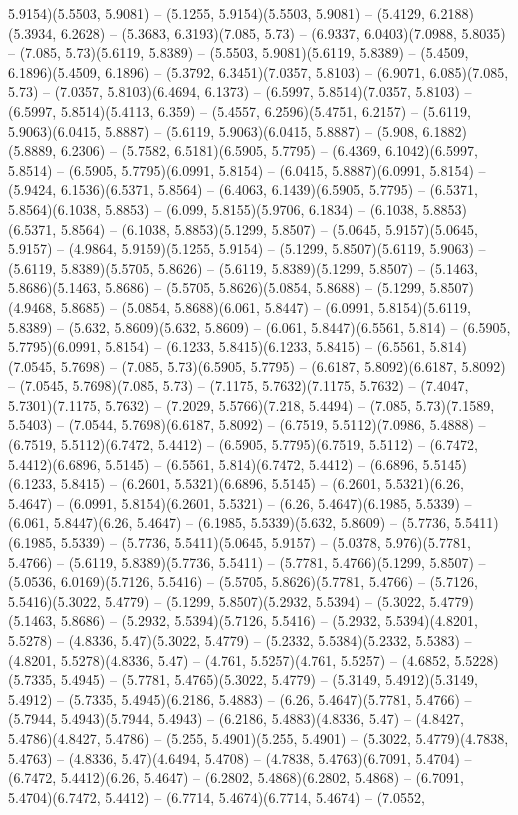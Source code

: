 5.9154)(5.5503, 5.9081) -- (5.1255, 5.9154)(5.5503, 5.9081) -- (5.4129, 6.2188)(5.3934, 6.2628) -- (5.3683, 6.3193)(7.085, 5.73) -- (6.9337, 6.0403)(7.0988, 5.8035) -- (7.085, 5.73)(5.6119, 5.8389) -- (5.5503, 5.9081)(5.6119, 5.8389) -- (5.4509, 6.1896)(5.4509, 6.1896) -- (5.3792, 6.3451)(7.0357, 5.8103) -- (6.9071, 6.085)(7.085, 5.73) -- (7.0357, 5.8103)(6.4694, 6.1373) -- (6.5997, 5.8514)(7.0357, 5.8103) -- (6.5997, 5.8514)(5.4113, 6.359) -- (5.4557, 6.2596)(5.4751, 6.2157) -- (5.6119, 5.9063)(6.0415, 5.8887) -- (5.6119, 5.9063)(6.0415, 5.8887) -- (5.908, 6.1882)(5.8889, 6.2306) -- (5.7582, 6.5181)(6.5905, 5.7795) -- (6.4369, 6.1042)(6.5997, 5.8514) -- (6.5905, 5.7795)(6.0991, 5.8154) -- (6.0415, 5.8887)(6.0991, 5.8154) -- (5.9424, 6.1536)(6.5371, 5.8564) -- (6.4063, 6.1439)(6.5905, 5.7795) -- (6.5371, 5.8564)(6.1038, 5.8853) -- (6.099, 5.8155)(5.9706, 6.1834) -- (6.1038, 5.8853)(6.5371, 5.8564) -- (6.1038, 5.8853)(5.1299, 5.8507) -- (5.0645, 5.9157)(5.0645, 5.9157) -- (4.9864, 5.9159)(5.1255, 5.9154) -- (5.1299, 5.8507)(5.6119, 5.9063) -- (5.6119, 5.8389)(5.5705, 5.8626) -- (5.6119, 5.8389)(5.1299, 5.8507) -- (5.1463, 5.8686)(5.1463, 5.8686) -- (5.5705, 5.8626)(5.0854, 5.8688) -- (5.1299, 5.8507)(4.9468, 5.8685) -- (5.0854, 5.8688)(6.061, 5.8447) -- (6.0991, 5.8154)(5.6119, 5.8389) -- (5.632, 5.8609)(5.632, 5.8609) -- (6.061, 5.8447)(6.5561, 5.814) -- (6.5905, 5.7795)(6.0991, 5.8154) -- (6.1233, 5.8415)(6.1233, 5.8415) -- (6.5561, 5.814)(7.0545, 5.7698) -- (7.085, 5.73)(6.5905, 5.7795) -- (6.6187, 5.8092)(6.6187, 5.8092) -- (7.0545, 5.7698)(7.085, 5.73) -- (7.1175, 5.7632)(7.1175, 5.7632) -- (7.4047, 5.7301)(7.1175, 5.7632) -- (7.2029, 5.5766)(7.218, 5.4494) -- (7.085, 5.73)(7.1589, 5.5403) -- (7.0544, 5.7698)(6.6187, 5.8092) -- (6.7519, 5.5112)(7.0986, 5.4888) -- (6.7519, 5.5112)(6.7472, 5.4412) -- (6.5905, 5.7795)(6.7519, 5.5112) -- (6.7472, 5.4412)(6.6896, 5.5145) -- (6.5561, 5.814)(6.7472, 5.4412) -- (6.6896, 5.5145)(6.1233, 5.8415) -- (6.2601, 5.5321)(6.6896, 5.5145) -- (6.2601, 5.5321)(6.26, 5.4647) -- (6.0991, 5.8154)(6.2601, 5.5321) -- (6.26, 5.4647)(6.1985, 5.5339) -- (6.061, 5.8447)(6.26, 5.4647) -- (6.1985, 5.5339)(5.632, 5.8609) -- (5.7736, 5.5411)(6.1985, 5.5339) -- (5.7736, 5.5411)(5.0645, 5.9157) -- (5.0378, 5.976)(5.7781, 5.4766) -- (5.6119, 5.8389)(5.7736, 5.5411) -- (5.7781, 5.4766)(5.1299, 5.8507) -- (5.0536, 6.0169)(5.7126, 5.5416) -- (5.5705, 5.8626)(5.7781, 5.4766) -- (5.7126, 5.5416)(5.3022, 5.4779) -- (5.1299, 5.8507)(5.2932, 5.5394) -- (5.3022, 5.4779)(5.1463, 5.8686) -- (5.2932, 5.5394)(5.7126, 5.5416) -- (5.2932, 5.5394)(4.8201, 5.5278) -- (4.8336, 5.47)(5.3022, 5.4779) -- (5.2332, 5.5384)(5.2332, 5.5383) -- (4.8201, 5.5278)(4.8336, 5.47) -- (4.761, 5.5257)(4.761, 5.5257) -- (4.6852, 5.5228)(5.7335, 5.4945) -- (5.7781, 5.4765)(5.3022, 5.4779) -- (5.3149, 5.4912)(5.3149, 5.4912) -- (5.7335, 5.4945)(6.2186, 5.4883) -- (6.26, 5.4647)(5.7781, 5.4766) -- (5.7944, 5.4943)(5.7944, 5.4943) -- (6.2186, 5.4883)(4.8336, 5.47) -- (4.8427, 5.4786)(4.8427, 5.4786) -- (5.255, 5.4901)(5.255, 5.4901) -- (5.3022, 5.4779)(4.7838, 5.4763) -- (4.8336, 5.47)(4.6494, 5.4708) -- (4.7838, 5.4763)(6.7091, 5.4704) -- (6.7472, 5.4412)(6.26, 5.4647) -- (6.2802, 5.4868)(6.2802, 5.4868) -- (6.7091, 5.4704)(6.7472, 5.4412) -- (6.7714, 5.4674)(6.7714, 5.4674) -- (7.0552, 